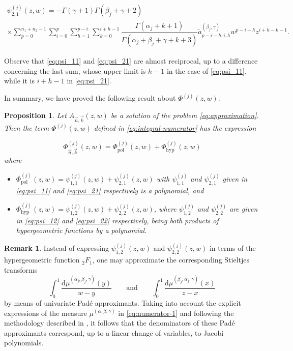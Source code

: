 \documentclass[11pt,reqno]{amsart}
\newtheorem{proposition}[theorem]{Proposition}
\theoremstyle{definition}
\newtheorem{remark}[theorem]{Remark}
\begin{document}
\begin{multline}
\label{eq:psi_21}
   \psi_{2,1}^{(j)}(z,w)=-\Gamma(\gamma+1)\Gamma(\beta_j+\gamma+2)\\ \times\sum_{p=0}^{n_1+n_2-1}\sum_{i=0}^p\sum_{h=1}^{p-i}\sum_{k=0}^{i+h-1}\dfrac{\Gamma(\alpha_j+k+1)}{\Gamma(\alpha_j+\beta_j+\gamma+k+3)}\tilde a_{p-i-h,i,h}^{(\beta_j,\gamma)}w^{p-i-h}z^{i+h-k-1}.
\end{multline}

Observe that \eqref{eq:psi_11} and \eqref{eq:psi_21} are almost reciprocal, up to a difference concerning the last sum, whose upper limit is $h-1$ in the case of \eqref{eq:psi_11}, while it is $i+h-1$ in \eqref{eq:psi_21}.


In summary, we have proved the following result about $\Phi^{(j)}(z,w)$.



\begin{proposition}\label{prop:numerator}
    Let $A_{\vec n,\vec k}(z,w)$ be a solution of the problem \eqref{eq:approximation}. Then the term $\Phi^{(j)}(z,w)$ defined in \eqref{eq:integral-numerator} has the expression

    $$
    \Phi^{(j)}_{\vec n,\vec k}(z,w)=\Phi^{(j)}_{\mathrm{pol}}(z,w)+\Phi^{(j)}_{\mathrm{hyp}}(z,w)
    $$
    where
    \begin{itemize}
        \item $
    \Phi^{(j)}_{\mathrm{pol}}(z,w)=\psi_{1,1}^{(j)}(z,w)+\psi_{2,1}^{(j)}(z,w)
    $ with $\psi_{1,1}^{(j)}$ and $\psi_{2,1}^{(j)}$ given in \eqref{eq:psi_11} and \eqref{eq:psi_21} respectively is a polynomial, and 
    \item  $\Phi^{(j)}_{\mathrm{hyp}}(z,w)=\psi_{1,2}^{(j)}(z,w)+\psi_{2,2}^{(j)}(z,w)$, where $\psi_{1,2}^{(j)}$ and $\psi_{2,2}^{(j)}$ are given in \eqref{eq:psi_12} and \eqref{eq:psi_22} respectively, being both products of hypergeometric functions by a polynomial.   
    \end{itemize}
\end{proposition}

\begin{remark} 
    Instead of expressing $\psi_{1,2}^{(j)}(z,w)$ and $\psi_{2,2}^{(j)}(z,w)$ in terms of the hypergeometric function ${}_2F_1$, one may approximate the corresponding Stieltjes transforms
    \[
    \int_0^1 \frac{\mathrm{d}\mu^{(\alpha_j,\beta_j,\gamma)}(y)}{w-y}
    \qquad\text{and}\qquad
    \int_0^1 \frac{\mathrm{d}\mu^{(\beta_j,\alpha_j,\gamma)}(x)}{z-x}
    \]
    by means of univariate Pad\'e approximants. Taking into account the explicit expressions of the measure $\mu^{(\alpha,\beta,\gamma)}$ in \eqref{eq:numerator-1} and following the methodology described in \citep{VA06}, it follows that the denominators of these Pad\'e approximants correspond, up to a linear change of variables, to Jacobi polynomials.
\end{remark}
\end{document}
